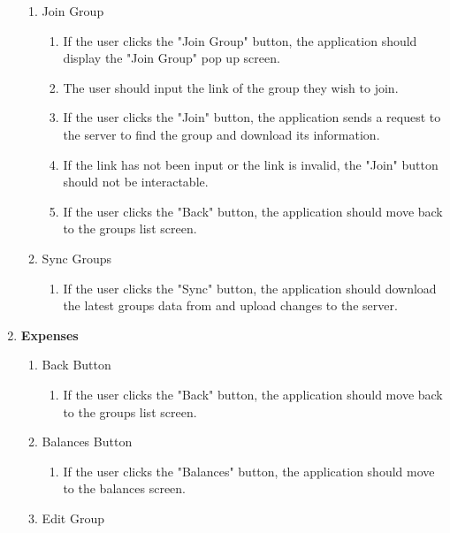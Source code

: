 \documentclass[conference]{IEEEtran}
\begin{document}
\begin{enumerate}
\begin{enumerate}
                \item Join Group
                    \begin{enumerate}
                        \item If the user clicks the "Join Group" button, the application should display the "Join Group" pop up screen.
                        \item The user should input the link of the group they wish to join.
                        \item If the user clicks the "Join" button, the application sends a request to the server to find the group and download its information.
                        \item If the link has not been input or the link is invalid, the "Join" button should not be interactable.
                        \item If the user clicks the "Back" button, the application should move back to the groups list screen.
                    \end{enumerate}
                \item Sync Groups
                    \begin{enumerate}
                        \item If the user clicks the "Sync" button, the application should download the latest groups data from and upload changes to the server.
                    \end{enumerate}
            \end{enumerate}
        \item \textbf{Expenses}
            \begin{enumerate}
                \item Back Button
                    \begin{enumerate}
                        \item If the user clicks the "Back" button, the application should move back to the groups list screen.
                    \end{enumerate}
                \item Balances Button
                    \begin{enumerate}
                        \item If the user clicks the "Balances" button, the application should move to the balances screen.
                    \end{enumerate}
                \item Edit Group
                    \begin{enumerate}

\end{enumerate}
\end{enumerate}
\end{enumerate}
\end{document}
